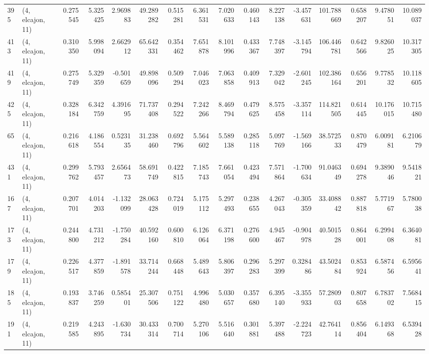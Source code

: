 \begin{tabular}{llrrrrrrrrrrrrrr}
395 &  (4, elcajon, 11) &   0.275545 &   5.325425 &   2.969883 &    49.289282 &   0.515281 &   6.361531 &   7.020633 &  0.460143 &   8.227138 &  -3.457631 &   101.788669 &   0.658207 &   9.478051 &  10.089037 \\
413 &  (4, elcajon, 11) &   0.310350 &   5.998094 &   2.662912 &    65.642331 &   0.354462 &   7.651878 &   8.101996 &  0.433367 &   7.748397 &  -3.145794 &   106.446781 &   0.642566 &   9.826025 &  10.317305 \\
419 &  (4, elcajon, 11) &   0.275749 &   5.329359 &  -0.501659 &    49.898096 &   0.509294 &   7.046023 &   7.063858 &  0.409913 &   7.329042 &  -2.601245 &   102.386164 &   0.656201 &   9.778532 &  10.118605 \\
425 &  (4, elcajon, 11) &   0.328184 &   6.342759 &   4.391695 &    71.737408 &   0.294522 &   7.242266 &   8.469794 &  0.479625 &   8.575458 &  -3.357114 &   114.821505 &   0.614445 &  10.176015 &  10.715480 \\
65  &  (4, elcajon, 11) &   0.216618 &   4.186554 &   0.523135 &    31.238460 &   0.692796 &   5.564602 &   5.589138 &  0.285118 &   5.097769 &  -1.569166 &    38.572533 &   0.870479 &   6.009181 &   6.210679 \\
431 &  (4, elcajon, 11) &   0.299762 &   5.793457 &   2.656473 &    58.691749 &   0.422815 &   7.185743 &   7.661054 &  0.423494 &   7.571864 &  -1.700634 &    91.046349 &   0.694278 &   9.389046 &   9.541821 \\
167 &  (4, elcajon, 11) &   0.207701 &   4.014203 &  -1.132099 &    28.063428 &   0.724019 &   5.175112 &   5.297493 &  0.238655 &   4.267043 &  -0.305359 &    33.408842 &   0.887818 &   5.771967 &   5.780038 \\
173 &  (4, elcajon, 11) &   0.244800 &   4.731212 &  -1.750284 &    40.592160 &   0.600810 &   6.126064 &   6.371198 &  0.276600 &   4.945467 &  -0.904978 &    40.501528 &   0.864001 &   6.299408 &   6.364081 \\
179 &  (4, elcajon, 11) &   0.226517 &   4.377859 &  -1.891578 &    33.714244 &   0.668448 &   5.489643 &   5.806397 &  0.296283 &   5.297399 &   0.328486 &    43.502484 &   0.853924 &   6.587456 &   6.595641 \\
185 &  (4, elcajon, 11) &   0.193837 &   3.746259 &   0.585401 &    25.307506 &   0.751122 &   4.996480 &   5.030657 &  0.357680 &   6.395140 &  -3.355933 &    57.280903 &   0.807658 &   6.783702 &   7.568415 \\
191 &  (4, elcajon, 11) &   0.219585 &   4.243895 &  -1.630734 &    30.433314 &   0.700714 &   5.270106 &   5.516640 &  0.301881 &   5.397488 &  -2.224723 &    42.764114 &   0.856404 &   6.149368 &   6.539428 \\

\end{tabular}
